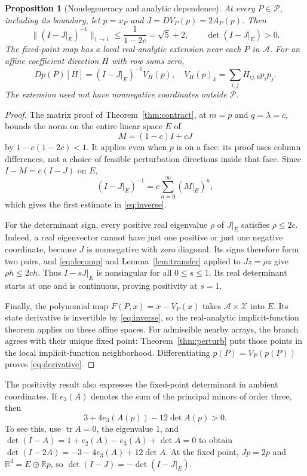 \documentclass[11pt]{amsart}
\newtheorem{proposition}[theorem]{Proposition}
\theoremstyle{definition}
\newcommand{\R}{\mathbb R}
\begin{document}
\begin{proposition}[Nondegeneracy and analytic dependence]\label{prop:analytic}
At every $P\in\mathcal P$, including its boundary, let $p=x_P$ and $J=DV_P(p)=2A_P(p)$. Then
\begin{equation}\label{eq:inverse}
 \|(I-J|_E)^{-1}\|_{1\to1}\le\frac1{1-2c}=\sqrt5+2,
 \qquad \det(I-J|_E)>0.
\end{equation}
The fixed-point map has a local real-analytic extension near each $P$ in $\mathscr A$. For an affine coefficient direction $H$ with row sums zero,
\begin{equation}\label{eq:derivative}
 Dp(P)[H]=(I-J|_E)^{-1}V_H(p),
 \quad V_H(p)_k=\sum_{i,j}H_{ij,k}p_ip_j.
\end{equation}
The extension need not have nonnegative coordinates outside $\mathcal P$.
\end{proposition}
\begin{proof}
The matrix proof of Theorem~\ref{thm:contract}, at $m=p$ and $q=\lambda=c$, bounds the norm on the entire linear space $E$ of
\[
 M=(1-c)I+cJ
\]
by $1-c(1-2c)<1$. It applies even when $p$ is on a face: its proof uses column differences, not a choice of feasible perturbation directions inside that face. Since $I-M=c(I-J)$ on $E$,
\[
 (I-J|_E)^{-1}=c\sum_{n=0}^\infty(M|_E)^n,
\]
which gives the first estimate in \eqref{eq:inverse}.

For the determinant sign, every positive real eigenvalue $\rho$ of $J|_E$ satisfies $\rho\le2c$. Indeed, a real eigenvector cannot have just one positive or just one negative coordinate, because $J$ is nonnegative with zero diagonal. Its signs therefore form two pairs, and \eqref{eq:decomp} and Lemma~\ref{lem:transfer} applied to $Jz=\rho z$ give $\rho h\le2ch$. Thus $I-sJ|_E$ is nonsingular for all $0\le s\le1$. Its real determinant starts at one and is continuous, proving positivity at $s=1$.

Finally, the polynomial map $F(P,x)=x-V_P(x)$ takes $\mathscr A\times\mathscr X$ into $E$. Its state derivative is invertible by \eqref{eq:inverse}, so the real-analytic implicit-function theorem applies on these affine spaces. For admissible nearby arrays, the branch agrees with their unique fixed point: Theorem~\ref{thm:perturb} puts those points in the local implicit-function neighborhood. Differentiating $p(P)=V_P(p(P))$ proves \eqref{eq:derivative}.
\end{proof}

The positivity result also expresses the fixed-point determinant in ambient coordinates. If $e_3(A)$ denotes the sum of the principal minors of order three, then
\begin{equation}\label{eq:detidentity}
 3+4e_3(A(p))-12\det A(p)>0.
\end{equation}
To see this, use $\operatorname{tr}A=0$, the eigenvalue $1$, and
$\det(I-A)=1+e_2(A)-e_3(A)+\det A=0$ to obtain
$\det(I-2A)=-3-4e_3(A)+12\det A$. At the fixed point, $Jp=2p$ and $\R^4=E\oplus\R p$, so $\det(I-J)=-\det(I-J|_E)$.
\end{document}

